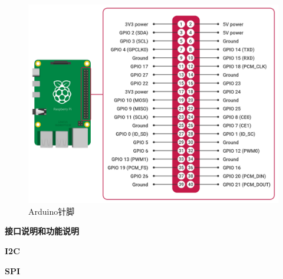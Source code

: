 \documentclass[UTF8,14pt]{article}
\newcommand\sectionone[1]{\centerline{\Large{\bfseries{#1}}}}
\newcommand\sectiontwo[1]{\centerline{\large{\bfseries{#1}}}}
\begin{document}
\vspace{1cm}
\begin{figure}[!h]
	\centering
	\vspace{-10pt}
	\includegraphics[width=14cm]{figures/Raspberry-Pinout.pdf}
	\caption{Arduino针脚}
	\vspace{-15pt}
\end{figure}

\clearpage
\sectionone{接口说明和功能说明}
\begin{multicols}{2}
	\sectiontwo{I2C}
	\sectiontwo{SPI}
\end{multicols}
\end{document}
